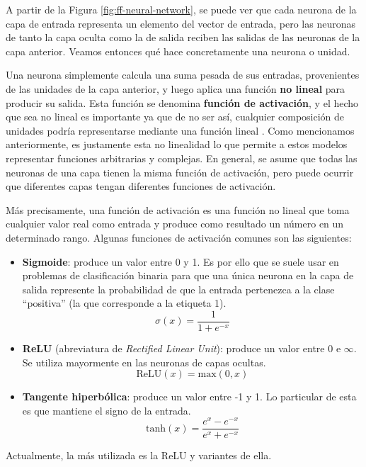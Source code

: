 \documentclass[../../main.tex]{subfiles}
\begin{document}
A partir de la Figura \ref{fig:ff-neural-network}, se puede ver que cada neurona de la
capa de entrada representa un elemento del vector de entrada, pero las neuronas de tanto
la capa oculta como la de salida reciben las salidas de las neuronas de la capa anterior.
Veamos entonces qué hace concretamente una neurona o unidad.

Una neurona simplemente calcula una suma pesada de sus entradas, provenientes de las
unidades de la capa anterior, y luego aplica una función \textbf{no lineal} para producir
su salida. Esta función se denomina \textbf{función de activación}, y el hecho que sea no
lineal es importante ya que de no ser así, cualquier composición de unidades podría
representarse mediante una función lineal \cite{ai-a-modern-approach}. Como mencionamos
anteriormente, es justamente esta no linealidad lo que permite a estos modelos representar
funciones arbitrarias \cite{ai-a-modern-approach} y complejas. En general, se asume que
todas las neuronas de una capa tienen la misma función de activación, pero puede ocurrir
que diferentes capas tengan diferentes funciones de activación.

Más precisamente, una función de activación es una función no lineal que toma cualquier
valor real como entrada y produce como resultado un número en un determinado rango.
Algunas funciones de activación comunes son las siguientes:
\begin{itemize}[itemsep=0.1cm]
    \item \textbf{Sigmoide}: produce un valor entre 0 y 1. Es por ello que se suele usar
    en problemas de clasificación binaria para que una única neurona en la capa de salida
    represente la probabilidad de que la entrada pertenezca a la clase ``positiva''
    (la que corresponde a la etiqueta 1).
    \[\sigma(x)=\frac{1}{1+e^{-x}}\]
    \item \textbf{ReLU} (abreviatura de \textit{Rectified Linear Unit}): produce un
    valor entre 0 e \(\infty\). Se utiliza mayormente en las neuronas de capas ocultas.
    \[\text{ReLU}(x) = \text{max}(0, x)\]
    \item \textbf{Tangente hiperbólica}: produce un valor entre -1 y 1. Lo particular de
    esta es que mantiene el signo de la entrada.
    \[\text{tanh}(x)=\frac{e^x - e^{-x}}{e^x + e^{-x}}\]
\end{itemize}
Actualmente, la más utilizada es la ReLU y variantes de ella.
\end{document}
